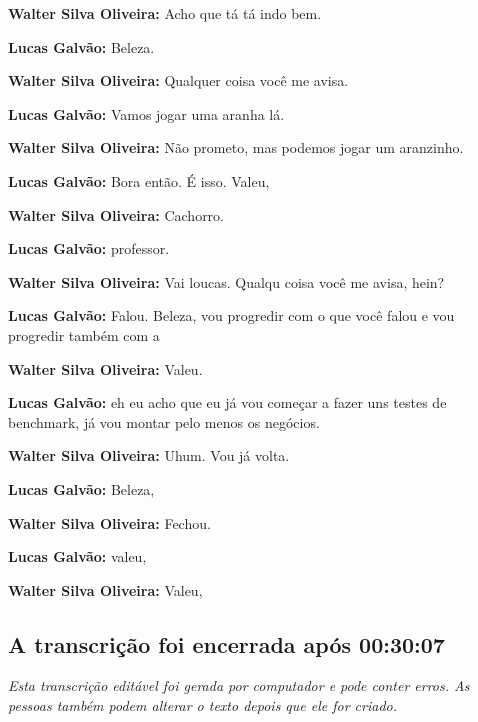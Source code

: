 \textbf{Walter Silva Oliveira:} Acho que tá tá indo bem.



\textbf{Lucas Galvão:} Beleza.



\textbf{Walter Silva Oliveira:} Qualquer coisa você me avisa.



\textbf{Lucas Galvão:} Vamos jogar uma aranha lá.



\textbf{Walter Silva Oliveira:} Não prometo, mas podemos jogar um aranzinho.



\textbf{Lucas Galvão:} Bora então. É isso. Valeu,



\textbf{Walter Silva Oliveira:} Cachorro.



\textbf{Lucas Galvão:} professor.



\textbf{Walter Silva Oliveira:} Vai loucas. Qualqu coisa você me avisa, hein?



\textbf{Lucas Galvão:} Falou. Beleza, vou progredir com o que você falou e vou progredir também com a



\textbf{Walter Silva Oliveira:} Valeu.



\textbf{Lucas Galvão:} eh eu acho que eu já vou começar a fazer uns testes de benchmark, já vou montar pelo menos os negócios.



\textbf{Walter Silva Oliveira:} Uhum. Vou já volta.



\textbf{Lucas Galvão:} Beleza,



\textbf{Walter Silva Oliveira:} Fechou.



\textbf{Lucas Galvão:} valeu,



\textbf{Walter Silva Oliveira:} Valeu,



\subsection{\textbf{A transcrição foi encerrada após 00:30:07}}



\emph{Esta transcrição editável foi gerada por computador e pode conter erros. As pessoas também podem alterar o texto depois que ele for criado.}

